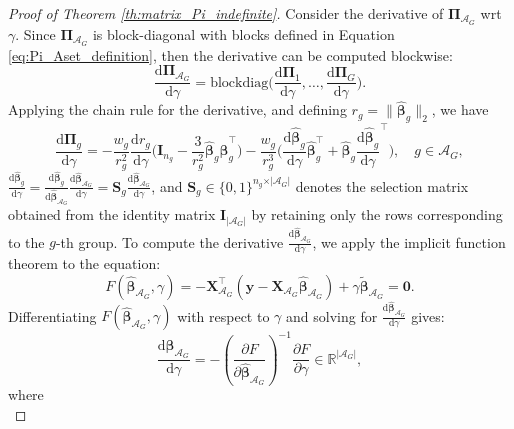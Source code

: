 \documentclass[10pt,a4paper]{amsart}
\newcommand{\Aset}{\mathcal{A}}
\newcommand{\T}{\top}
\def\bI{\mathbf{I}}
\def\bPi{\boldsymbol{\Pi}}
\def\bS{\mathbf{S}}
\def\bX{\mathbf{X}}
\def\bbeta{\boldsymbol{\beta}}
\newcommand{\betahat}{\widehat{\boldsymbol\beta}}
\def\by{\boldsymbol{y}}
\begin{document}
\begin{proof}[Proof of Theorem \ref{th:matrix_Pi_indefinite}]
Consider the derivative of $\bPi_{\Aset_G}$ wrt $\gamma$. Since $\bPi_{\Aset_G}$ is block-diagonal with blocks defined in Equation \eqref{eq:Pi_Aset_definition}, then the derivative can be computed blockwise:
\begin{equation*}
\frac{\mathrm{d}\bPi_{\Aset_G} }{\mathrm{d}\gamma}= \mathrm{blockdiag}\Big(\frac{\mathrm{d}\bPi_{1}}{\mathrm{d}\gamma}, \ldots, \frac{\mathrm{d}\bPi_{G}}{\mathrm{d}\gamma}\Big).
\end{equation*}
Applying the chain rule for the derivative, and defining $r_g=\|\betahat_{g}\|_2$, we have
\begin{equation}
\label{eq:Pi_derivative}
\frac{\mathrm{d}\bPi_{g}}{\mathrm{d}\gamma}
= -\frac{w_g}{r_g^2}\frac{\mathrm{d}r_g}{\mathrm{d}\gamma}\Big(\bI_{n_g}-\frac{3}{r_g^2} \widehat{\bbeta}_g \widehat{\bbeta}_g^{\T} \Big)-  \frac{w_g}{r_g^3} \Big( \frac{\mathrm{d}\betahat_g}{\mathrm{d}\gamma} \widehat{\bbeta}_g^{\T} + \widehat{\bbeta}_g \frac{\mathrm{d}\betahat_g}{\mathrm{d}\gamma}^{\T} \Big),\quad g \in \Aset_G,
\end{equation}
$\frac{\mathrm{d}\betahat_g}{\mathrm{d}\gamma}=\frac{\mathrm{d}\betahat_g}{\mathrm{d}\betahat_{\Aset_G}}\frac{\mathrm{d}\betahat_{\Aset_G}}{\mathrm{d}\gamma}=\bS_{g}\frac{\mathrm{d}\betahat_{\Aset_G}}{\mathrm{d}\gamma}$, and $\bS_{g}\in\{0,1\}^{n_g\times\vert\Aset_G\vert}$ denotes the selection matrix obtained from the identity matrix $\bI_{\vert\Aset_G\vert}$ by retaining only the rows corresponding to the $g$-th group. To compute the derivative $\frac{\mathrm{d}\widehat{\bbeta}_{\Aset_G}}{\mathrm{d}\gamma}$, we apply the implicit function theorem to the equation:
\begin{equation*}
F(\widehat{\bbeta}_{\Aset_G}, \gamma) =-\bX_{\Aset_G}^{\T}\left(\by-\bX_{\Aset_G}\betahat_{\Aset_G}\right)+\gamma\widetilde{\bbeta}_{\Aset_G} =\boldsymbol{0}.
\end{equation*}
Differentiating $F(\widehat{\bbeta}_{\Aset_G}, \gamma)$ with respect to $\gamma$ and solving for $\frac{\mathrm{d}\widehat{\bbeta}_{\Aset_G}}{\mathrm{d} \gamma}$ gives:
\begin{equation}
\label{eq:IFT_Pi}
\frac{\mathrm{d}\widehat{\bbeta}_{\Aset_G}}{\mathrm{d}\gamma} = -\left( \frac{\partial F}{\partial \widehat{\bbeta}_{\Aset_G}} \right)^{-1}  \frac{\partial F}{\partial \gamma}\in\mathbb{R}^{\vert\Aset_G\vert},
\end{equation}
where
\begin{equation*}

\end{equation*}
\end{proof}
\end{document}
